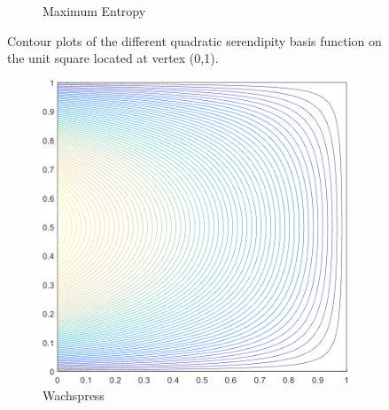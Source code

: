 \begin{figure}
\begin{subfigure}[b]{0.39\textwidth}
		\caption{Maximum Entropy}
	\end{subfigure}
\caption{Contour plots of the different quadratic serendipity basis function on the unit square located at vertex (0,1).}
\label{fig::2D_Quadratic_Summary_unit_square_basis_functions_BF4}
\end{figure}

\begin{figure}
\centering
	\begin{subfigure}[b]{0.39\textwidth}
		\centering
		\includegraphics[width=\textwidth]{figures/sec_BF/square_WACHSPRESS2_contour_b8.png}
		\caption{Wachspress}
	\end{subfigure}
	\hspace{1.5cm}
	\begin{subfigure}[b]{0.39\textwidth}
		\centering

\end{subfigure}
\end{figure}
